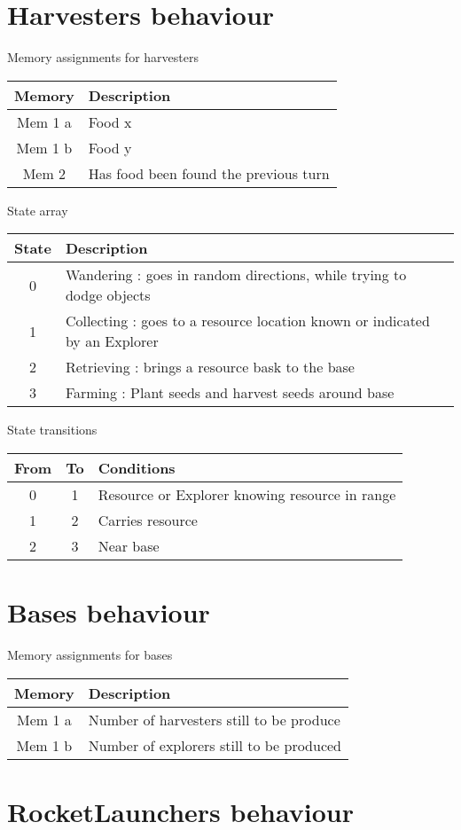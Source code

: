 \documentclass{article}
\begin{document}
\section{Harvesters behaviour}

\begin{table}[ht]
	Memory assignments for harvesters\\
	\begin{tabular}{|c|l|}
		\hline
		Memory & Description\\
		\hline
		Mem 1 a & Food x\\
		Mem 1 b & Food y\\
		\hline
                Mem 2 & Has food been found the previous turn\\
                \hline
	\end{tabular}
\end{table}

\begin{table}[ht]
	State array\\
	\begin{tabular}{|c|l|}
		\hline
		State & Description \\
		\hline
		0 & Wandering : goes in random directions, while trying to dodge objects\\
		\hline
		1 & Collecting : goes to a resource location known or indicated by an Explorer\\
		\hline
		2 & Retrieving : brings a resource bask to the base\\
		\hline
		3 & Farming : Plant seeds and harvest seeds around base\\
		\hline
	\end{tabular}
\end{table}

\begin{table}[ht]
	State transitions\\
	\begin{tabular}{|c|c|l|}
		\hline
		From & To & Conditions\\
		\hline
		0 & 1 & Resource or Explorer knowing resource in range\\
		\hline
		1 & 2 & Carries resource\\
		\hline
		2 & 3 & Near base\\
		\hline
	\end{tabular}
\end{table}

\section{Bases behaviour}

\begin{table}[ht]
	Memory assignments for bases\\
	\begin{tabular}{|c|l|}
		\hline
		Memory & Description\\
		\hline
		Mem 1 a & Number of harvesters still to be produce\\
		Mem 1 b & Number of explorers still to be produced\\
		\hline
	\end{tabular}
\end{table}

\section{RocketLaunchers behaviour}
\end{document}

